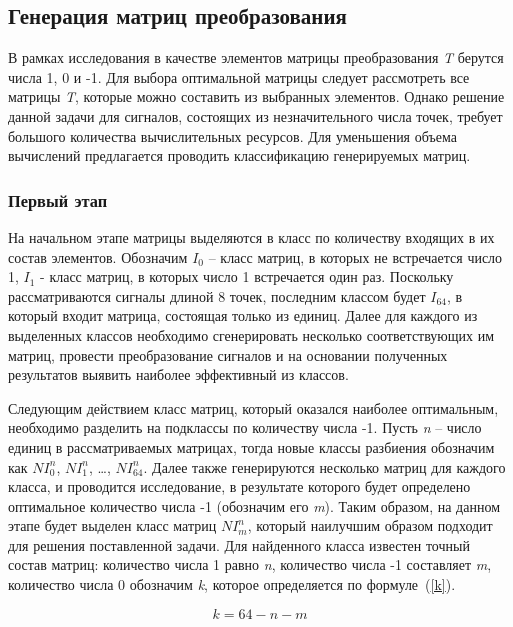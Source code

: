 \documentclass[11pt, oneside, a4paper]{article}
\begin{document}
\subsection{Генерация матриц преобразования}

В рамках исследования в качестве элементов матрицы преобразования \textit {T} берутся числа 1, 0 и -1. Для выбора оптимальной матрицы следует рассмотреть все матрицы \textit {T}, которые можно составить из выбранных элементов. Однако решение данной задачи для сигналов, состоящих из незначительного числа точек, требует большого количества вычислительных ресурсов. Для уменьшения объема вычислений предлагается проводить классификацию генерируемых матриц. 

\subsubsection{Первый этап}

На начальном этапе матрицы выделяются в класс по количеству входящих в их состав элементов. Обозначим $I_0$ – класс матриц, в которых не встречается число 1, $I_1$ - класс матриц, в которых число 1 встречается один раз. Поскольку рассматриваются сигналы длиной 8 точек, последним классом будет $I_{64}$, в который входит матрица, состоящая только из единиц. Далее для каждого из выделенных классов необходимо сгенерировать несколько соответствующих им матриц, провести преобразование сигналов и на основании полученных результатов выявить наиболее эффективный из классов.

Следующим действием класс матриц, который оказался наиболее оптимальным, необходимо разделить на подклассы по количеству числа -1. Пусть {\it n} – число единиц в рассматриваемых матрицах, тогда новые классы разбиения обозначим как $NI_0^n$, $NI_1^n$, \ldots, $NI^n_{64}$. Далее также генерируются несколько матриц для каждого класса, и проводится исследование, в результате которого будет определено оптимальное количество числа -1 (обозначим его {\it m}). Таким образом, на данном этапе будет выделен класс матриц $NI_m^n$, который наилучшим образом подходит для решения поставленной задачи. Для найденного класса известен точный состав матриц: количество числа 1 равно {\it n}, количество числа -1 составляет {\it m}, количество числа 0 обозначим {\it k}, которое определяется по формуле~(\ref{k}).

\begin{equation}
\label{k}
k=64-n-m
\end{equation}
\end{document}
